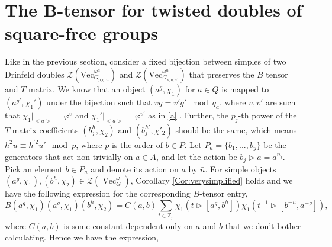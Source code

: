 \documentclass[11pt]{book}
\theoremstyle{Rem}
\theoremstyle{definition}
\numberwithin{equation}{section}
\newcommand\hit{\triangleright}
\newcommand\inv{^{-1}}
\newcommand\Vect{\operatorname{Vec}}
\newcommand\ZZ{\mathbb Z}
\newcommand\CTR{\mathcal Z}
\newcommand\coeff{C(a,b)}
\newcommand{\pb}{\bar{p}}
\newcommand{\nb}{\bar{n}}
\begin{document}
\section{The B-tensor for twisted doubles of square-free groups}
Like in the previous section, consider a fixed bijection between simples of two Drinfeld doubles  $\mathcal{Z}(\text{Vec}^{\omega^u}_{G_{p, q, n}})$ and $\mathcal{Z}(\text{Vec}^{\omega^{u'}}_{G_{p,q,n'}})$ that preserves the $B$ tensor and $T$ matrix. We know that an object $(a^g, \chi_1)$ for $a\in Q$ is mapped to $(a^{g'}, \chi_1')$ under the bijection such that $vg = v'g' \mod q_a$, where $v, v'$ are such that $\chi_1|_{<a>} =\varphi^v$ and $\chi_1'|_{<a>}= \varphi^{v'}$ as in \ref{a} . Further, the $p_j$-th power of the $T$ matrix coefficients $(b_j^h, \chi_2)$ and $(b_j^{h'}, \chi'_2)$ should be the same, which means $h^2u\equiv h^{\prime 2}u'\mod \pb$, where $\pb$ is the order of $b\in P$. Let $ P_a = \{b_1,...,b_y\}$ be the generators that act non-trivially on $a\in A$, and let the action be  $b_j\hit a = a^{n_j}$. Pick an element $b\in P_a$ and denote its action on $a$ by $\nb$.  For simple objects $(a^g, \chi_1),(b^h, \chi_2) \in \CTR(\Vect^\omega_G)$, Corollary \ref{Cor:verysimplified} holds and we have the following expression for the corresponding $B$-tensor entry,	
\begin{equation}
	B{(a^g, \chi_1)(a^g, \chi_1)(b^h,\chi_2)} = \coeff\sum_{t\in \ZZ_p} \chi_1(t \hit[a^g, b^h])\chi_1(t\inv \hit [b^{-h},  a^{-g}]),
\end{equation}
where $\coeff$ is some constant dependent only on $a$ and $b$ that we don't bother calculating. Hence we have the expression,
\end{document}
